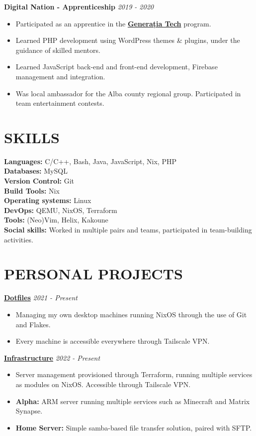 \documentclass[margin]{res}
\begin{document}
\begin{resume}
  {\bf Digital Nation - Apprenticeship} \hfill \textit{2019 - 2020}\\
  \begin{itemize}
    \item Participated as an apprentice in the \href{https://generatiatech.ro}{\textbf{Generația Tech}} program.
    \item Learned PHP development using WordPress themes \& plugins, under the guidance of skilled mentors.
    \item Learned JavaScript back-end and front-end development, Firebase management and integration.
    \item Was local ambassador for the Alba county regional group. Participated in team entertainment contests.
  \end{itemize}

  \section{SKILLS}
  {\bf Languages:} C/C++, Bash, Java, JavaScript, Nix, PHP\\
  {\bf Databases:} MySQL\\
  {\bf Version Control:} Git\\
  {\bf Build Tools:} Nix\\
  {\bf Operating systems:} Linux\\
  {\bf DevOps:} QEMU, NixOS, Terraform\\
  {\bf Tools:} (Neo)Vim, Helix, Kakoune\\

  {\bf Social skills:} Worked in multiple pairs and teams, participated in team-building activities.

  \section{PERSONAL PROJECTS}

  {\bf \href{https://github.com/fufexan/dotfiles}{Dotfiles}} \hfill \textit{2021 - Present}\\
  \begin{itemize}
    \item Managing my own desktop machines running NixOS through the use of Git and Flakes.
    \item Every machine is accessible everywhere through Tailscale VPN.
  \end{itemize}


  {\bf \href{https://github.com/fufexan/infra}{Infrastructure}} \hfill \textit{2022 - Present}\\
  \begin{itemize}
    \item Server management provisioned through Terraform, running multiple services as modules on NixOS. Accessible through Tailscale VPN.
    \item \textbf{Alpha:} ARM server running multiple services such as Minecraft and Matrix Synapse.
    \item \textbf{Home Server:} Simple samba-based file transfer solution, paired with SFTP.
  \end{itemize}


\end{resume}
\end{document}
